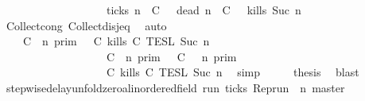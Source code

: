 \begin{isabellebody}
\ \ \ \ \ \ \ \ \ \ \ \ \ \ \ \ \ {\isasymunion}\ {\isacharbraceleft}{\isasymrho}{\isachardot}\ {\isacharquery}ticks\ n\ {\isasymrho}\ C\ {\isasyminter}\ {\isacharbraceleft}{\isasymrho}{\isachardot}\ {\isacharquery}dead\ n\ {\isasymrho}\ C\ {\isasyminter}\ {\isacharbraceleft}{\isasymrho}{\isachardot}\ {\isacharquery}kills\ {\isacharparenleft}Suc\ n{\isacharparenright}\ {\isasymrho}{\isacharbraceright}{\isacartoucheclose}\isanewline
\ \ \ \ \isamarkupfalse%
\ Collect{\isacharunderscore}cong\ Collect{\isacharunderscore}disj{\isacharunderscore}eq\ \isamarkupfalse%
\ auto\isanewline
\ \ \isamarkupfalse%
\ \isamarkupfalse%
\ {\isacartoucheopen}{\isachardot}{\isachardot}{\isachardot}\ {\isacharequal}\ {\isasymlbrakk}\ C\ {\isasymnot}{\isasymUp}\ n\ {\isasymrbrakk}\isactrlsub p\isactrlsub r\isactrlsub i\isactrlsub m\ {\isasyminter}\ {\isasymlbrakk}\ C\ kills\ C\ {\isasymrbrakk}\isactrlsub T\isactrlsub E\isactrlsub S\isactrlsub L\isactrlbsup {\isasymge}\ Suc\ n\isactrlesup \isanewline
\ \ \ \ \ \ \ \ \ \ \ \ \ \ \ \ \ {\isasymunion}\ {\isasymlbrakk}\ C\ {\isasymUp}\ n\ {\isasymrbrakk}\isactrlsub p\isactrlsub r\isactrlsub i\isactrlsub m\ {\isasyminter}\ {\isasymlbrakk}\ C\ {\isasymnot}{\isasymUp}\ {\isasymge}\ n\ {\isasymrbrakk}\isactrlsub p\isactrlsub r\isactrlsub i\isactrlsub m\isanewline
\ \ \ \ \ \ \ \ \ \ \ \ \ \ \ \ \ {\isasyminter}\ {\isasymlbrakk}\ C\ kills\ C\ {\isasymrbrakk}\isactrlsub T\isactrlsub E\isactrlsub S\isactrlsub L\isactrlbsup {\isasymge}\ Suc\ n\isactrlesup {\isacartoucheclose}\ \isamarkupfalse%
\ simp\isanewline
\ \ \isamarkupfalse%
\ \isamarkupfalse%
\ {\isacharquery}thesis\ \isamarkupfalse%
\ blast\isanewline
{}\isamarkupfalse%
%
\endisatagproof
{\isafoldproof}%
%
\isadelimproof
\isanewline
%
\endisadelimproof
\isanewline
{}\isamarkupfalse%
\ stepwise{\isacharunderscore}delay{\isacharunderscore}unfold{\isacharunderscore}zero{\isacharcolon}{\isacartoucheopen}{\isacharbraceleft}{\isasymrho}{\isacharcolon}{\isacharcolon}{\isacharparenleft}{\isacharprime}a{\isacharcolon}{\isacharcolon}linordered{\isacharunderscore}field{\isacharparenright}\ run{\isachardot}\ ticks\ {\isacharparenleft}Rep{\isacharunderscore}run\ {\isasymrho}\ n\ master{\isacharparenright}\ \isanewline

\end{isabellebody}
